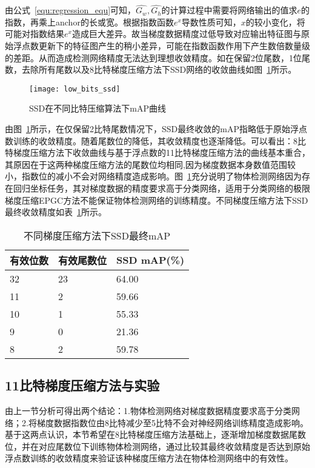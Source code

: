 由公式~\ref{equ:regression_equ}可知，$\hat{G_{w}}, \hat{G_{h}}$的计算过程中需要将网络输出的值求$e$的指数，再乘上anchor的长或宽。根据指数函数$e^{x}$导数性质可知，$x$的较小变化，将可能对指数结果$e^{x}$造成巨大差异。故当梯度数据精度过低导致对应输出特征图与原始浮点数更新下的特征图产生的稍小差异，可能在指数函数作用下产生数倍数量级的差距。从而造成检测网络精度无法达到理想收敛精度。如在保留2位尾数，1位尾数，去除所有尾数以及8比特梯度压缩方法下SSD网络的收敛曲线如图~\ref{fig:low_bits_ssd}所示。
\begin{figure}[htp]
\centering
\texttt{[image: low\_bits\_ssd]}
\caption{SSD在不同比特压缩算法下mAP曲线}
\label{fig:low_bits_ssd}
\end{figure}

由图~\ref{fig:low_bits_ssd}所示，在仅保留2比特尾数情况下，SSD最终收敛的mAP指略低于原始浮点数训练的收敛精度。随着尾数位的降低，其收敛精度也逐渐降低。可以看出：8比特梯度压缩方法下收敛曲线与基于浮点数的11比特梯度压缩方法的曲线基本重合，其原因在于这两种梯度压缩方法的尾数位均相同,因为梯度数据本身数值范围较小，指数位的减小不会对网络精度造成影响。图~\ref{fig:low_bits_ssd}充分说明了物体检测网络因为存在回归坐标任务，其对梯度数据的精度要求高于分类网络，适用于分类网络的极限梯度压缩EPGC方法不能保证物体检测网络的训练精度。不同梯度压缩方法下SSD最终收敛精度如表~\ref{tab:ssd_accs}所示。
\begin{table}[htb]
\centering
\noindent\begin{minipage}{0.6\textwidth}
\centering
\caption{不同梯度压缩方法下SSD最终mAP}
\label{tab:ssd_accs}
\begin{tabular}{p{2cm}p{2cm}p{2.5cm}}
\toprule[1.5pt]
有效位数 & 有效尾数位 & SSD mAP(\%) \\\midrule[1pt]
32 & 23 & 64.00 \\
11 & 2 & 59.66 \\
10 & 1 & 55.33 \\
9 & 0 & 21.36 \\
8 & 2 & 59.78 \\
\midrule[1pt]
\end{tabular}
\end{minipage}
\end{table}

\subsection{11比特梯度压缩方法与实验}
由上一节分析可得出两个结论：1.物体检测网络对梯度数据精度要求高于分类网络；2.将梯度数据指数位由8比特减少至5比特不会对神经网络训练精度造成影响。基于这两点认识，本节希望在8比特梯度压缩方法基础上，逐渐增加梯度数据尾数位，并在对应尾数位下训练物体检测网络，通过比较其最终收敛精度是否达到原始浮点数训练的收敛精度来验证该种梯度压缩方法在物体检测网络中的有效性。

